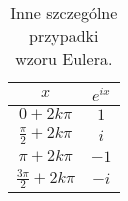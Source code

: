 \begin{table}[htbp]
    \centering
    \begin{tabular}{|c|c|}
        \hline
        $ x $ & $ e^{ix} $ \\
        \hline
        $ 0 + 2k \pi$ & $ 1 $ \\
        \hline
        $ \frac{\pi}{2} + 2k \pi $ & $ i $ \\
        \hline
        $ \pi + 2k \pi $ & $ -1 $ \\
        \hline
        $ \frac{3\pi}{2} + 2k \pi $ & $ -i $ \\
        \hline
    \end{tabular}
    \caption{Inne szczególne przypadki wzoru Eulera.}
    \label{tab:special_cases}
\end{table}